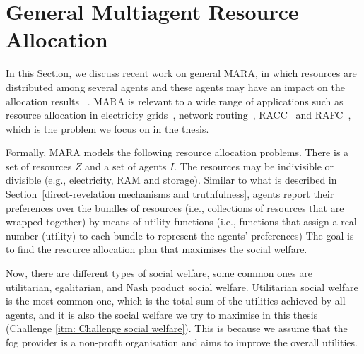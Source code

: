 \documentclass[11pt]{phdthesis}
\begin{document}
\section{General Multiagent Resource Allocation} \label{general-multiagent-resource-allocation}
In this Section, we discuss recent work on general MARA, in which resources are distributed among several agents and these agents may have an impact on the allocation results ~\citep{chevaleyre2006issues}. MARA is relevant to a wide range of applications such as resource allocation in electricity grids~\citep{gradwell2005distributed}, network routing~\citep{feldmann2003selfish}, RACC~\citep{wang2017multiagent} and RAFC~\citep{yi2015survey}, which is the problem we focus on in the thesis. 

Formally, MARA models the following resource allocation problems. There is a set of resources $ Z $ and a set of agents $ I $. The resources may be indivisible or divisible (e.g., electricity, RAM and storage). Similar to what is described in Section~\ref{direct-revelation mechanisms and truthfulness}, agents report their preferences over the bundles of resources (i.e., collections of resources that are wrapped together) by means of utility functions
(i.e., functions that assign a real number (utility) to each bundle to represent the  agents' preferences) 
The goal is to find the resource allocation plan that maximises the social welfare.

Now, there are different types of social welfare, some common ones are utilitarian, egalitarian, and Nash product social welfare. Utilitarian social welfare is the most common one, which is the total sum of the utilities achieved by all agents, and it is also the social welfare we try to maximise in this thesis (Challenge \ref{itm: Challenge social welfare}). This is because we assume that the fog provider is a non-profit organisation and aims to improve the overall utilities. 
\end{document}
